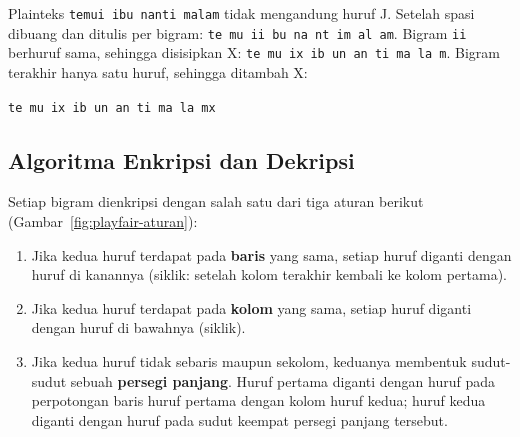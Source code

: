 \begin{contoh}
Plainteks \texttt{temui ibu nanti malam} tidak mengandung huruf J. Setelah spasi dibuang dan ditulis per bigram: \texttt{te mu ii bu na nt im al am}. Bigram \texttt{ii} berhuruf sama, sehingga disisipkan X: \texttt{te mu ix ib un an ti ma la m}. Bigram terakhir hanya satu huruf, sehingga ditambah X:
\begin{center}
\texttt{te mu ix ib un an ti ma la mx}
\end{center}
\end{contoh}

\subsection{Algoritma Enkripsi dan Dekripsi}

Setiap bigram dienkripsi dengan salah satu dari tiga aturan berikut (Gambar~\ref{fig:playfair-aturan}):
\begin{enumerate}
  \item Jika kedua huruf terdapat pada \textbf{baris} yang sama, setiap huruf diganti dengan huruf di kanannya (siklik: setelah kolom terakhir kembali ke kolom pertama).
  \item Jika kedua huruf terdapat pada \textbf{kolom} yang sama, setiap huruf diganti dengan huruf di bawahnya (siklik).
  \item Jika kedua huruf tidak sebaris maupun sekolom, keduanya membentuk sudut-sudut sebuah \textbf{persegi panjang}. Huruf pertama diganti dengan huruf pada perpotongan baris huruf pertama dengan kolom huruf kedua; huruf kedua diganti dengan huruf pada sudut keempat persegi panjang tersebut.
\end{enumerate}

